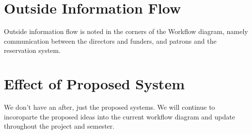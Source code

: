 \documentclass[12pt]{article} %
\begin{document}
\section{Outside Information Flow} %
  Outside information flow is noted in the corners of the Workflow diagram, namely communication between the directors and funders, and patrons and the reservation system.

\section{Effect of Proposed System} %
  We don't have an after, just the proposed systems.  We will continue to incoroparte the proposed ideas into the current workflow diagram and update throughout the project and semester.
\end{document}
